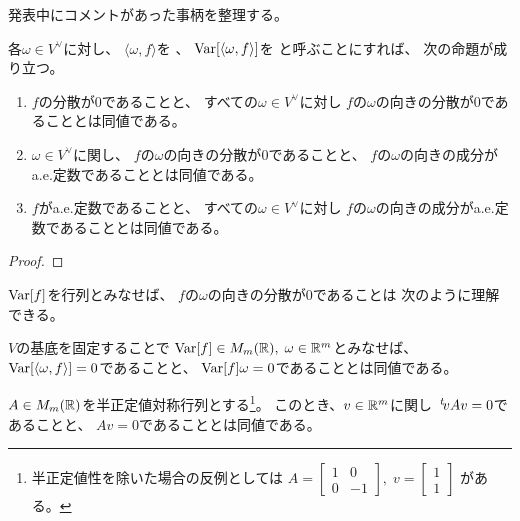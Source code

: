 \documentclass[report]{jlreq}
\begin{document}
%

発表中にコメントがあった事柄を整理する。

各$\omega \in V^\vee$に対し、
$\langle \omega, f \rangle$を
、
$\operatorname{Var}[\langle \omega, f \rangle]$を
と呼ぶことにすれば、
次の命題が成り立つ。

\begin{proposition}
    \begin{enumerate}
        \item $f$の分散が$0$であることと、
            すべての$\omega \in V^\vee$に対し
            $f$の$\omega$の向きの分散が$0$であることとは同値である。
        \item $\omega \in V^\vee$に関し、
            $f$の$\omega$の向きの分散が$0$であることと、
            $f$の$\omega$の向きの成分がa.e.定数であることとは同値である。
        \item $f$がa.e.定数であることと、
            すべての$\omega \in V^\vee$に対し
            $f$の$\omega$の向きの成分がa.e.定数であることとは同値である。
    \end{enumerate}
\end{proposition}

\begin{proof}
    \TODO{}
\end{proof}

$\operatorname{Var}[f]$を行列とみなせば、
$f$の$\omega$の向きの分散が$0$であることは
次のように理解できる。

\begin{proposition}
    $V$の基底を固定することで
    $\operatorname{Var}[f] \in M_m(\mathbb{R}), \; \omega \in \mathbb{R}^m$とみなせば、
    $\operatorname{Var}[\langle \omega, f \rangle] = 0$であることと、
    $\operatorname{Var}[f]\omega = 0$であることとは同値である。
\end{proposition}

\begin{lemma}
    $A \in M_m(\mathbb{R})$を半正定値対称行列とする\footnote{
        半正定値性を除いた場合の反例としては
        $A = \begin{bmatrix}
            1 & 0 \\
            0 & -1
        \end{bmatrix}, \;
            v = \begin{bmatrix}
                1 \\ 1
            \end{bmatrix}$
        がある。
    }。
    このとき、$v \in \mathbb{R}^m$に関し
    $\,{}^{t}\!v A v = 0$であることと、
    $Av = 0$であることとは同値である。
\end{lemma}
\end{document}
